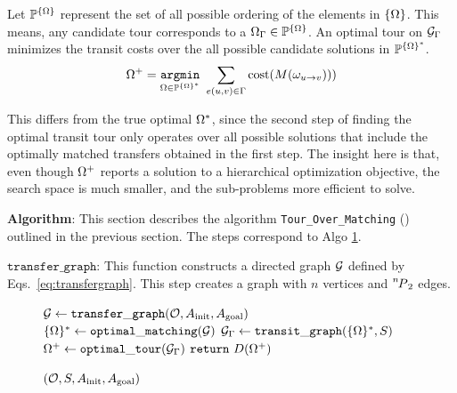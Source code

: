Let $ \mathbb{P}^{\scomaset} $ represent the set of all possible ordering of the elements in $ \scomaset $. This means, any candidate tour corresponds to a $ \scoma_\tour\in\mathbb{P}^{\scomaset} $. An optimal tour on $ \tspgraph $ minimizes the transit costs over the all possible candidate solutions in  $ \mathbb{P}^{\scomaset^*} $.
\vspace{-0.1in}
\begin{equation}
\scoma^+ = \underset{ \scoma \in  \mathbb{P}^{\scomaset^*}   }{ \mathtt{argmin} } \ \sum_{e(u,v)\in\tour}\cost({M}( \coma_{u\rightarrow v} ))  )
\vspace{-0.05in}
\end{equation}

This differs from the true optimal $ \scoma^* $, since the second step of finding the optimal transit tour only operates over all possible solutions that include the optimally matched transfers obtained in the first step.
The insight here is that, even though $ \scoma^+ $ reports a solution to a hierarchical optimization objective, 
the search space is much smaller, and the sub-problems more efficient to solve.\\

\vspace{-0.1in}

\noindent\textbf{Algorithm}: This section describes the algorithm {\tt {Tour\_Over\_Matching}} (\algo) outlined in the previous section. The steps correspond to Algo \ref{algo:tom}. 

\noindent $ \mathtt{transfer\_graph} $: This function constructs a directed graph $ \graph $ defined by Eqs.~\ref{eq:transfergraph}. This step creates a graph with $ n $ vertices and $ \permu[n]{2} $ edges.

\begin{figure}\vspace{-0.3in}
  \begin{minipage}{0.6\textwidth}
  \vspace{0pt} 
    \begin{algorithm}[H]
    \caption{{\tt \algo}$ (\objectset, \startq, \ainit, \atarget) $}
    \label{algo:tom}
    $ \graph \leftarrow \mathtt{transfer\_graph}(\objectset, \ainit, \atarget) $\;
    $ \scomaset^* \leftarrow \mathtt{optimal\_matching}(\graph) $\;
    $ \tspgraph \leftarrow \mathtt{transit\_graph}(\scomaset^*, \startq) $\;
    $ \scoma^+\leftarrow\mathtt{optimal\_tour}(\tspgraph) $\;
    $ \mathbf{\mathtt{return}}\ \trajset(\scoma^+)$\;
    \end{algorithm}
  \end{minipage}
  \vspace{-0.3in}
\end{figure}

